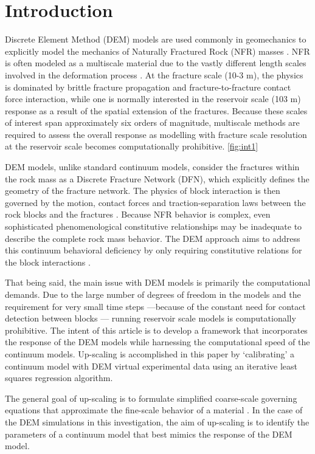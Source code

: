 \section{Introduction}
Discrete Element Method (DEM) models are used commonly in geomechanics to explicitly model the mechanics of Naturally Fractured Rock (NFR) masses \cite{jing_review_2003}. NFR is often modeled as a multiscale material due to the vastly different length scales involved in the deformation process \cite{zhou_flow_2003}. At the fracture scale (10-3 m), the physics is dominated by brittle fracture propagation and fracture-to-fracture contact force interaction, while one is normally interested in the reservoir scale (103 m) response as a result of the spatial extension of the fractures. Because these scales of interest span approximately six orders of magnitude, multiscale methods are required to assess the overall response as modelling with fracture scale resolution at the reservoir scale becomes computationally prohibitive. \ref{fig:int1}

DEM models, unlike standard continuum models, consider the fractures within the rock mass as a Discrete Fracture Network (DFN), which explicitly defines the geometry of the fracture network. The physics of block interaction is then governed by the motion, contact forces and traction-separation laws between the rock blocks and the fractures \cite{Cundall_1979}. Because NFR behavior is complex, even sophisticated phenomenological constitutive relationships may be inadequate to describe the complete rock mass behavior. The DEM approach aims to address this continuum behavioral deficiency by only requiring constitutive relations for the block interactions \cite{Cundall_2001}.

That being said, the main issue with DEM models is primarily the computational demands. Due to the large number of degrees of freedom in the models and the requirement for very small time steps —because of the constant need for contact detection between blocks — running reservoir scale models is computationally prohibitive. The intent of this article is to develop a framework that incorporates the response of the DEM models while harnessing the computational speed of the continuum models. Up-scaling is accomplished in this paper by ‘calibrating’ a continuum model with DEM virtual experimental data using an iterative least squares regression algorithm.

The general goal of up-scaling is to formulate simplified coarse-scale governing equations that approximate the fine-scale behavior of a material \cite{Geers_2010}. In the case of the DEM simulations in this investigation, the aim of up-scaling is to identify the parameters of a continuum model that best mimics the response of the DEM model.

